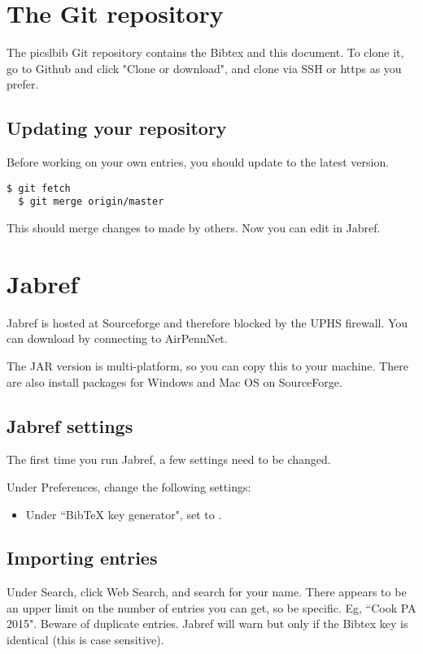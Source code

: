 \documentclass{InsightArticle}
\begin{document}
\section{The Git repository}

The picslbib Git repository contains the Bibtex and this document. To clone it, go to Github and click "Clone or download", and clone via SSH or https as you prefer.


\subsection{Updating your repository}

Before working on your own entries, you should update to the latest version.
\begin{lstlisting}[style=bash]
  $ git fetch
  $ git merge origin/master
\end{lstlisting}

This should merge changes to  made by others. Now you can edit  in Jabref.

\section{Jabref}

Jabref is hosted at Sourceforge and therefore blocked by the UPHS firewall. You can download by connecting to AirPennNet.

The JAR version is multi-platform, so you can copy this to your machine. There are also install packages for Windows and Mac OS on SourceForge.

\subsection{Jabref settings}

The first time you run Jabref, a few settings need to be changed.

Under Preferences, change the following settings:
\begin{itemize}
\item Under ``BibTeX key generator", set  to .
\end{itemize}


\subsection{Importing entries}

Under Search, click Web Search, and search for your name. There appears to be an upper limit on the number of entries you can get, so be specific. Eg, ``Cook PA 2015". Beware of duplicate entries. Jabref will warn but only if the Bibtex key is identical (this is case sensitive).
\end{document}

